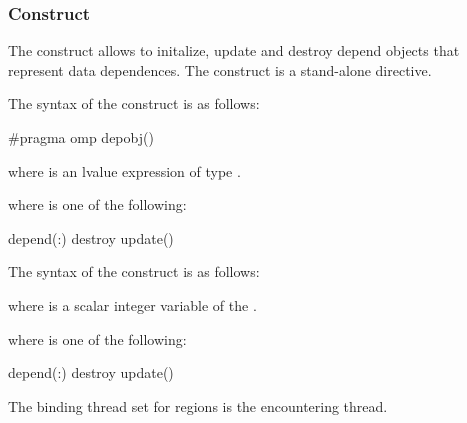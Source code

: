 \subsubsection{ Construct}
\label{subsubsec:depobj Construct}
\summary
The  construct allows to initalize, update and destroy depend objects that represent data dependences. The  construct is a stand-alone directive.

\syntax

\begin{ccppspecific}
\begin{samepage}
The syntax of the  construct is as follows:

\begin{ompcPragma}
#pragma omp depobj() 
\end{ompcPragma}
\end{samepage}
where  is an lvalue expression of type .

where  is one of the following{}:

\begin{indentedcodelist}
depend(:)
destroy
update()
\end{indentedcodelist}
\end{ccppspecific}

\begin{fortranspecific}
The syntax of the  construct is as follows:

\begin{ompfPragma}
!$omp depobj(\plc{depobj) \plc{clause}
\end{ompfPragma}
where  is a scalar integer variable of the  .

where  is one of the following{}:

\begin{indentedcodelist}
depend(:)
destroy
update()
\end{indentedcodelist}
\end{fortranspecific}

\binding

The binding thread set for  regions is the encountering thread.

\descr

